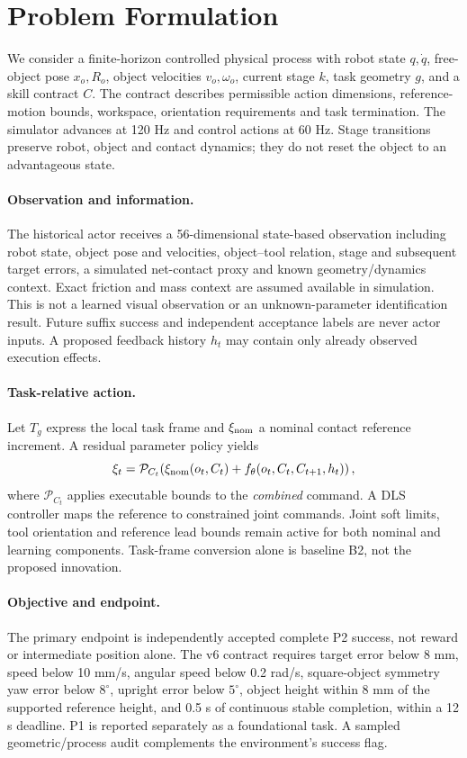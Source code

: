 \section{Problem Formulation}
We consider a finite-horizon controlled physical process with robot state $q,\dot q$, free-object pose $x_o,R_o$, object velocities $v_o,\omega_o$, current stage $k$, task geometry $g$, and a skill contract $C$. The contract describes permissible action dimensions, reference-motion bounds, workspace, orientation requirements and task termination. The simulator advances at 120 Hz and control actions at 60 Hz. Stage transitions preserve robot, object and contact dynamics; they do not reset the object to an advantageous state.

\paragraph{Observation and information.}
The historical actor receives a 56-dimensional state-based observation including robot state, object pose and velocities, object--tool relation, stage and subsequent target errors, a simulated net-contact proxy and known geometry/dynamics context. Exact friction and mass context are assumed available in simulation. This is not a learned visual observation or an unknown-parameter identification result. Future suffix success and independent acceptance labels are never actor inputs. A proposed feedback history $h_t$ may contain only already observed execution effects.

\paragraph{Task-relative action.}
Let $T_g$ express the local task frame and $\xi_{\rm nom}$ a nominal contact reference increment. A residual parameter policy yields
\begin{equation}
 \xi_t=\mathcal{P}_{C_t}\!\left(\xi_{\rm nom}(o_t,C_t)+f_\theta(o_t,C_t,C_{t+1},h_t)\right),
 \label{eq:action}
\end{equation}
where $\mathcal{P}_{C_t}$ applies executable bounds to the \emph{combined} command. A DLS controller maps the reference to constrained joint commands. Joint soft limits, tool orientation and reference lead bounds remain active for both nominal and learning components. Task-frame conversion alone is baseline B2, not the proposed innovation.

\paragraph{Objective and endpoint.}
The primary endpoint is independently accepted complete P2 success, not reward or intermediate position alone. The v6 contract requires target error below 8 mm, speed below 10 mm/s, angular speed below 0.2 rad/s, square-object symmetry yaw error below $8^\circ$, upright error below $5^\circ$, object height within 8 mm of the supported reference height, and 0.5 s of continuous stable completion, within a 12 s deadline. P1 is reported separately as a foundational task. A sampled geometric/process audit complements the environment's success flag.

